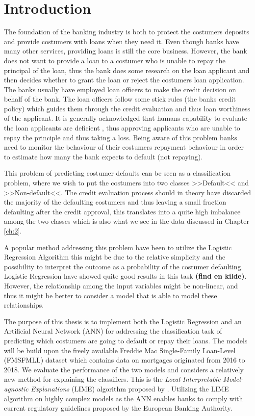\chapter{Introduction}\label{ch:1}
The foundation of the banking industry is both to protect the costumers deposits and provide costumers with loans when they need it. Even though banks have many other services, providing loans is still the core business. However, the bank does not want to provide a loan to a costumer who is unable to repay the principal of the loan, thus the bank does some research on the loan applicant and then decides whether to grant the loan or reject the costumers loan application. 
The banks usually have employed loan officers to make the credit decision on behalf of the bank. The loan officers follow some stick rules (the banks credit policy) which guides them through the credit evaluation and thus loan worthiness of the applicant. It is generally acknowledged that humans capability to evaluate the loan applicants are deficient \cite{Glorfeld_1996}, thus approving applicants who are unable to repay the principle and thus taking a loss. Being aware of this problem banks need to monitor the behaviour of their costumers repayment behaviour in order to estimate how many the bank expects to default (not repaying).   

This problem of predicting costumer defaults can be seen as a classification problem, where we wish to put the costumers into two classes >>Default<< and >>Non-default<<. The credit evaluation process should in theory have discarded the majority of the defaulting costumers and thus leaving a small fraction defaulting after the credit approval, this translates into a quite high imbalance among the two classes which is also what we see in the data discussed in Chapter \ref{ch:2}.

A popular method addressing this problem have been to utilize the Logistic Regression Algorithm this might be due to the relative simplicity and the possibility to interpret the outcome as a probability of the costumer defaulting. Logistic Regression have showed quite good results in this task \textbf{(find en kilde)}. However, the relationship among the input variables might be non-linear, and thus it might be better to consider a model that is able to model these relationships. 

The purpose of this thesis is to implement both the Logistic Regression and an Artificial Neural Network (ANN) for addressing the classification task of predicting which costumers are going to default or repay their loans. The models will be build upon the freely available Freddie Mac Single-Family Loan-Level (FMSFMLL) dataset which contains data on mortgages originated from 2016 to 2018. We evaluate the performance of the two models and considers a relatively new method for explaining the classifiers. This is the \textit{Local Interpretable Model-agnostic Explanations} (LIME) algorithm proposed by \cite{lime_2016}. Utilizing the LIME algorithm on highly complex models as the ANN enables banks to comply with current regulatory guidelines proposed by the European Banking Authority. 

